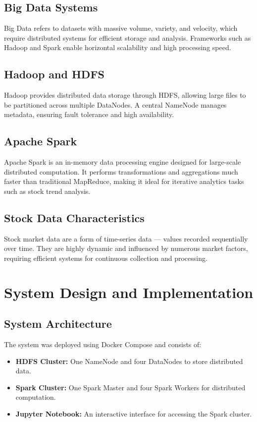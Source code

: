 \documentclass[12pt,a4paper]{article}
\begin{document}
\subsection{Big Data Systems}
Big Data refers to datasets with massive volume, variety, and velocity, which require distributed systems for efficient storage and analysis.  
Frameworks such as Hadoop and Spark enable horizontal scalability and high processing speed.

\subsection{Hadoop and HDFS}
Hadoop provides distributed data storage through HDFS, allowing large files to be partitioned across multiple DataNodes.  
A central NameNode manages metadata, ensuring fault tolerance and high availability.

\subsection{Apache Spark}
Apache Spark is an in-memory data processing engine designed for large-scale distributed computation.  
It performs transformations and aggregations much faster than traditional MapReduce, making it ideal for iterative analytics tasks such as stock trend analysis.

\subsection{Stock Data Characteristics}
Stock market data are a form of time-series data — values recorded sequentially over time.  
They are highly dynamic and influenced by numerous market factors, requiring efficient systems for continuous collection and processing.

\section{System Design and Implementation}

\subsection{System Architecture}
The system was deployed using Docker Compose and consists of:

\begin{itemize}
    \item \textbf{HDFS Cluster:} One NameNode and four DataNodes to store distributed data.
    \item \textbf{Spark Cluster:} One Spark Master and four Spark Workers for distributed computation.
    \item \textbf{Jupyter Notebook:} An interactive interface for accessing the Spark cluster.
\end{itemize}
\end{document}
